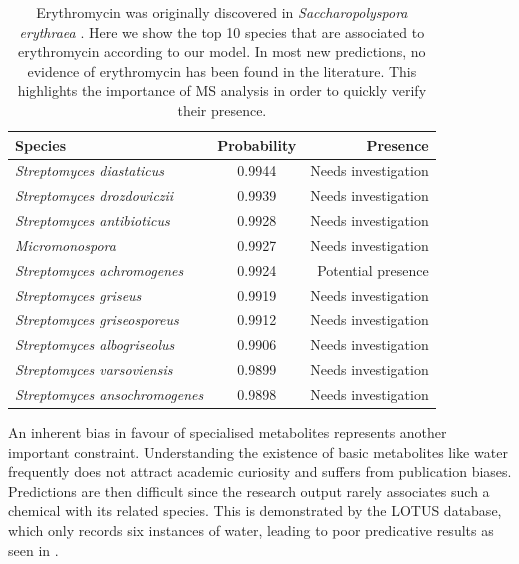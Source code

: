 \documentclass[
11pt, %
oneside, %
english, %
singlespacing, %
headsepline, %
chapterinoneline, %
]{MastersDoctoralThesis} %
\begin{document}
\begin{table}[h]
	\centering
	\caption{Erythromycin was originally discovered in \textit{Saccharopolyspora erythraea} \cite{beranIsolationErythromycinNoxide1991}. Here we show the top 10 species that are associated to erythromycin according to our model. In most new predictions, no evidence of erythromycin has been found in the literature. This highlights the importance of MS analysis in order to quickly verify their presence.}
	\begin{tabular}{lcr}
		\toprule
		Species & Probability & Presence\\
		\midrule
		\textit{Streptomyces diastaticus} & 0.9944 & Needs investigation\\
		\textit{Streptomyces drozdowiczii} & 0.9939 & Needs investigation\\
		\textit{Streptomyces antibioticus} & 0.9928 & Needs investigation\\
		\textit{Micromonospora} & 0.9927 & Needs investigation\\
		\textit{Streptomyces achromogenes} & 0.9924 & Potential presence \cite{moosawiComputationalPredictionProperties2010}\\
		\textit{Streptomyces griseus} & 0.9919 & Needs investigation\\
		\textit{Streptomyces griseosporeus} & 0.9912 & Needs investigation\\
		\textit{Streptomyces albogriseolus} & 0.9906 & Needs investigation\\
		\textit{Streptomyces varsoviensis} & 0.9899 & Needs investigation\\
		\textit{Streptomyces ansochromogenes} & 0.9898 & Needs investigation\\
		\bottomrule
	\end{tabular}
	\label{table: Erythromycin top scores}
\end{table}

An inherent bias in favour of specialised metabolites represents another important constraint. Understanding the existence of basic metabolites like water frequently does not attract academic curiosity and suffers from publication biases. Predictions are then difficult since the research output rarely associates such a chemical with its related species. This is demonstrated by the LOTUS database, which only records six instances of water, leading to poor predicative results as seen in .
\end{document}

